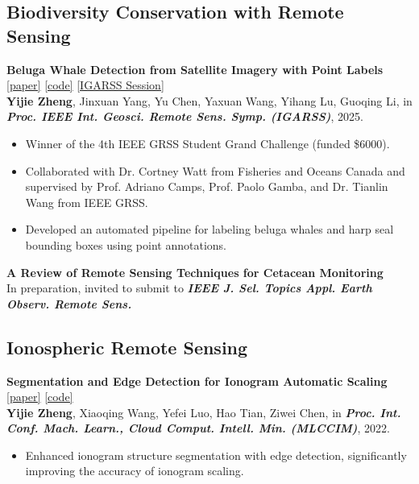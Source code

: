 \documentclass[11pt,a4paper]{article}
\newcommand{\papertitle}[1]{\textbf{#1}}
\newcommand{\journalname}[1]{\textit{\textbf{#1}}}
\begin{document}
\vspace{0.5em}

\subsection*{Biodiversity Conservation with Remote Sensing}
\papertitle{Beluga Whale Detection from Satellite Imagery with Point Labels}
\href{https://arxiv.org/abs/2505.12066}{[paper]}
\href{https://github.com/VoyagerXvoyagerx/beluga-seeker}{[code]}
\href{https://www.2025.ieeeigarss.org/view_paper.php?PaperNum=2430&SessionID=1426}{[IGARSS Session]} \\
\textbf{Yijie Zheng}, Jinxuan Yang, Yu Chen, Yaxuan Wang, Yihang Lu, Guoqing Li, in \journalname{Proc. IEEE Int. Geosci. Remote Sens. Symp. (IGARSS)}, 2025.
\begin{itemize}[leftmargin=1em]
    \item Winner of the 4th IEEE GRSS Student Grand Challenge (funded \$6000).
    \item Collaborated with Dr. Cortney Watt from Fisheries and Oceans Canada and supervised by Prof. Adriano Camps, Prof. Paolo Gamba, and Dr. Tianlin Wang from IEEE GRSS.
    \item Developed an automated pipeline for labeling beluga whales and harp seal bounding boxes using point annotations.
\end{itemize}

\vspace{0.5em}

\noindent\papertitle{A Review of Remote Sensing Techniques for Cetacean Monitoring} \\
In preparation, invited to submit to \journalname{IEEE J. Sel. Topics Appl. Earth Observ. Remote Sens.}

\vspace{0.5em}

\subsection*{Ionospheric Remote Sensing}
\papertitle{Segmentation and Edge Detection for Ionogram Automatic Scaling}
\href{https://ieeexplore.ieee.org/document/9955166/}{[paper]}
\href{https://github.com/VoyagerXvoyagerx/Ionogram}{[code]} \\
\textbf{Yijie Zheng}, Xiaoqing Wang, Yefei Luo, Hao Tian, Ziwei Chen, in \journalname{Proc. Int. Conf. Mach. Learn., Cloud Comput. Intell. Min. (MLCCIM)}, 2022.
\begin{itemize}[leftmargin=1em]
    \item Enhanced ionogram structure segmentation with edge detection, significantly improving the accuracy of ionogram scaling.
\end{itemize}
\end{document}
